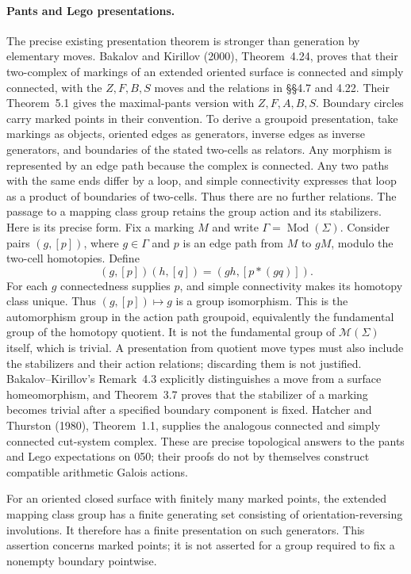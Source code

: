 \paragraph{Pants and Lego presentations.}
The precise existing presentation theorem is stronger than
generation by elementary moves. Bakalov and Kirillov (2000),
Theorem~4.24, proves that their two-complex of markings of an
extended oriented surface is connected and simply connected, with
the $Z,F,B,S$ moves and the relations in \S\S4.7 and 4.22.
Their Theorem~5.1 gives the maximal-pants version with
$Z,F,A,B,S$. Boundary circles carry marked points in their
convention. To derive a groupoid presentation, take markings as
objects, oriented edges as generators, inverse edges as inverse
generators, and boundaries of the stated two-cells as relators.
Any morphism is represented by an edge path because the complex
is connected. Any two paths with the same ends differ by a loop,
and simple connectivity expresses that loop as a product of
boundaries of two-cells. Thus there are no further relations.
The passage to a mapping class group retains the group action and
its stabilizers. Here is its precise form. Fix a marking $M$ and
write $\Gamma=\operatorname{Mod}(\Sigma)$. Consider pairs
$(g,[p])$, where $g\in\Gamma$ and $p$ is an edge path from $M$
to $gM$, modulo the two-cell homotopies. Define
\[
 (g,[p])(h,[q])=(gh,[p*(gq)]).
\]
For each $g$ connectedness supplies $p$, and simple connectivity
makes its homotopy class unique. Thus $(g,[p])\mapsto g$ is a
group isomorphism. This is the automorphism group in the action
path groupoid, equivalently the fundamental group of the homotopy
quotient. It is not the fundamental group of $\mathcal M(\Sigma)$
itself, which is trivial. A presentation from quotient move types
must also include the stabilizers and their action relations;
discarding them is not justified. Bakalov--Kirillov's Remark~4.3
explicitly distinguishes a move from a surface homeomorphism,
and Theorem~3.7 proves that the stabilizer of a marking becomes
trivial after a specified boundary component is fixed.
Hatcher and
Thurston (1980), Theorem~1.1, supplies the analogous connected and
simply connected cut-system complex. These are precise topological
answers to the pants and Lego expectations on 050; their proofs do
not by themselves construct compatible arithmetic Galois actions.

\begin{proposition}
\label{A:reflection-generators}
For an oriented closed surface with finitely many marked points,
the extended mapping class group has a finite generating set
consisting of orientation-reversing involutions. It therefore has
a finite presentation on such generators. This assertion concerns
marked points; it is not asserted for a group required to fix a
nonempty boundary pointwise.
\end{proposition}

